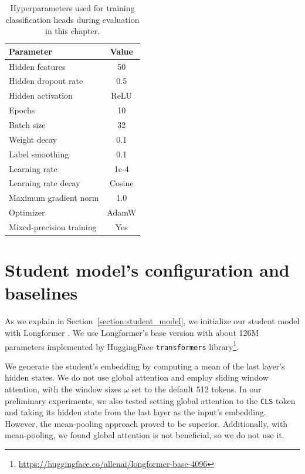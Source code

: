 \begin{table}
  \centering
  \footnotesize

  \begin{tabular}{l c}
    \toprule
    Parameter & Value \\
    \midrule
    Hidden features & 50 \\
    Hidden dropout rate & 0.5 \\
    Hidden activation & ReLU \\
    Epochs & 10 \\
    Batch size & 32 \\
    Weight decay & 0.1 \\
    Label smoothing & 0.1 \\
    Learning rate & 1e-4 \\
    Learning rate decay & Cosine \\
    Maximum gradient norm & 1.0 \\
    Optimizer & AdamW \\
    Mixed-precision training & Yes \\
    \bottomrule
  \end{tabular}

  \caption{Hyperparameters used for training classification heads during
  evaluation in this chapter.}

  \label{table:head_train_params}

\end{table}

\section{Student model's configuration and baselines}\label{section:student_model_config_baselines}

As we explain in Section~\ref{section:student_model}, we initialize our
student model with Longformer \citep{beltagy2020longformer}. We use
Longformer's base version with about 126M parameters implemented by HuggingFace
\texttt{transformers}
library\footnote{\url{https://huggingface.co/allenai/longformer-base-4096}}.

We generate the student's embedding by computing a mean of the last layer's hidden states. We do not use global attention and employ sliding window
attention, with the window sizes $\omega$ set to the default 512 tokens. In our
preliminary experiments, we also tested setting global attention to the
\texttt{CLS} token and taking its hidden state from the last layer as the
input's embedding. However, the mean-pooling approach proved to be superior.
Additionally, with mean-pooling, we found global attention is not beneficial,
so we do not use it.

